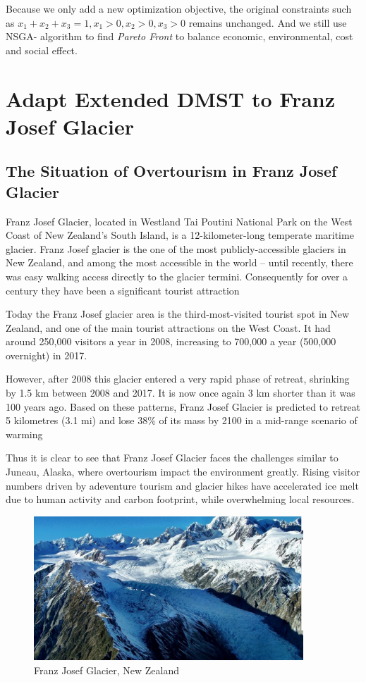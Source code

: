 \documentclass{mcmthesis}
\begin{document}
Because we only add a new optimization objective, the original constraints such as $x_1+x_2+x_3=1, x_1>0,x_2>0,x_3>0$ 
remains unchanged. And we still use NSGA-\uppercase\expandafter{} algorithm to find
\emph{Pareto Front} to balance economic, environmental, cost and social effect.

\section{Adapt Extended DMST to Franz Josef Glacier}
\subsection{The Situation of Overtourism in Franz Josef Glacier}
Franz Josef Glacier, located in Westland Tai Poutini National Park on the West Coast of New Zealand's South Island, 
is a 12-kilometer-long temperate maritime glacier. Franz Josef glacier is the one of the most publicly-accessible glaciers in New Zealand,
and among the most accessible in the world -- until recently, there was easy walking access directly to the glacier termini. 
Consequently for over a century they have been a significant tourist attraction\cite{wilson2013west}

Today the Franz Josef glacier area is the third-most-visited tourist spot in New Zealand, 
and one of the main tourist attractions on the West Coast. It had around 250,000 visitors a year in 2008, 
increasing to 700,000 a year (500,000 overnight) in 2017.

However, after 2008 this glacier entered a very rapid phase of retreat, shrinking by 1.5 km between 2008 and 2017.
It is now once again 3 km shorter than it was 100 years ago. Based on these patterns, 
Franz Josef Glacier is predicted to retreat 5 kilometres (3.1 mi) and lose 38\% of its mass by 2100 in a mid-range scenario of warming\cite{anderson2008response}

Thus it is clear to see that Franz Josef Glacier faces the challenges similar to Juneau, Alaska, where overtourism 
impact the environment greatly. Rising visitor numbers driven by adeventure tourism and glacier hikes have accelerated ice melt
due to human activity and carbon footprint, while overwhelming local resources.

\begin{figure}[H]
  \centering
  \includegraphics[width=0.9\textwidth]{figures/glaicer2.png}
  \caption{Franz Josef Glacier, New Zealand}
  \label{Fig.3}
\end{figure}
\end{document}
